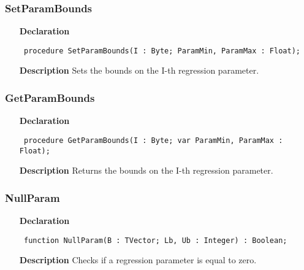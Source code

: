 \documentclass[12pt,a4paper,oneside]{report}
\newcommand{\declarationitem}[1]{\textbf{#1}}
\newcommand{\descriptiontitle}[1]{\textbf{#1}}
\newcommand{\code}[1]{\texttt{#1}}
\begin{document}
\subsubsection{SetParamBounds}
\label{unlfit-SetParamBounds}
\begin{itemize}\item[\declarationitem{Declaration}\hfill]
	\begin{flushleft}
		\code{
			procedure SetParamBounds(I : Byte; ParamMin, ParamMax : Float);}
		
	\end{flushleft}
	
	\par
	\item[\descriptiontitle{Description}]
	Sets the bounds on the I{-}th regression parameter.
	
\end{itemize}
\subsubsection{GetParamBounds}
\label{unlfit-GetParamBounds}
\begin{itemize}\item[\declarationitem{Declaration}\hfill]
	\begin{flushleft}
		\code{
			procedure GetParamBounds(I : Byte; var ParamMin, ParamMax : Float);}
		
	\end{flushleft}
	
	\par
	\item[\descriptiontitle{Description}]
	Returns the bounds on the I{-}th regression parameter.
	
\end{itemize}
\subsubsection{NullParam}
\label{unlfit-NullParam}
\begin{itemize}\item[\declarationitem{Declaration}\hfill]
	\begin{flushleft}
		\code{
			function NullParam(B : TVector; Lb, Ub : Integer) : Boolean;}
		
	\end{flushleft}
	
	\par
	\item[\descriptiontitle{Description}]
	Checks if a regression parameter is equal to zero.
	
\end{itemize}
\end{document}
